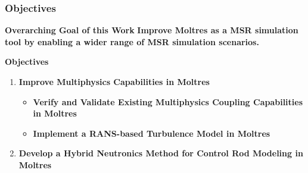\begin{frame}
  \frametitle{Objectives}
  \begin{block}{\textbf{Overarching Goal of this Work}}
    \textbf{Improve Moltres as a MSR simulation tool by enabling a wider range of MSR simulation
    scenarios.}
  \end{block}
  \begin{block}{\textbf{Objectives}}
    \begin{enumerate}
      \item \textbf{Improve Multiphysics Capabilities in Moltres}
      \begin{itemize}
        \item \textbf{Verify and Validate Existing Multiphysics Coupling Capabilities in Moltres}
        \item \textbf{Implement a RANS-based Turbulence Model in Moltres}
      \end{itemize}
      \item \textbf{Develop a Hybrid Neutronics Method for Control Rod Modeling in Moltres}
    \end{enumerate}
  \end{block}
\end{frame}
